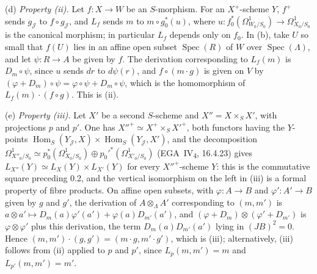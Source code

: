 (d) \emph{Property (ii).} Let \(f\colon X\to W\) be an \(S\)-morphism. For an
\(X^+\)-scheme \(Y\), \(f^+\) sends \(g_{\mathscr J}\) to
\(f\circ g_{\mathscr J}\), and \(L_f\) sends \(m\) to \(m\circ g_0^*(u)\),
where \(u\colon f_0^*(\Omega^1_{W_0/S_0})\to\Omega^1_{X_0/S_0}\) is the
canonical morphism; in particular \(L_f\) depends only on \(f_0\). In (b),
take \(U\) so small that \(f(U)\) lies in an affine open subset
\(\operatorname{Spec}(R)\) of \(W\) over \(\operatorname{Spec}(\Lambda)\), and
let \(\psi\colon R\to A\) be given by \(f\). The derivation corresponding to
\(L_f(m)\) is \(D_m\circ\psi\), since \(u\) sends \(dr\) to \(d\psi(r)\),
and \(f\circ(m\cdot g)\) is given on \(V\) by
\((\varphi+D_m)\circ\psi=\varphi\circ\psi+D_m\circ\psi\), which is the
homomorphism of \(L_f(m)\cdot(f\circ g)\). This is (ii).

(e) \emph{Property (iii).} Let \(X'\) be a second \(S\)-scheme and
\(X''=X\times_SX'\), with projections \(p\) and \(p'\). One has
\(X''^+\simeq X^+\times_SX'^+\), both functors having the \(Y\)-points
\(\operatorname{Hom}_S(Y_{\mathscr J},X)\times
\operatorname{Hom}_S(Y_{\mathscr J},X')\), and the decomposition
\(\Omega^1_{X''_0/S_0}\simeq p_0^*(\Omega^1_{X_0/S_0})\oplus
p_0'^*(\Omega^1_{X'_0/S_0})\) (EGA~IV\textsubscript{4}, 16.4.23) gives
\(L_{X''}(Y)\simeq L_X(Y)\times L_{X'}(Y)\) for every \(X''^+\)-scheme
\(Y\): this is the commutative square preceding 0.2, and the vertical
isomorphism on the left in (iii) is a formal property of fibre products. On
affine open subsets, with \(\varphi\colon A\to B\) and
\(\varphi'\colon A'\to B\) given by \(g\) and \(g'\), the derivation of
\(A\otimes_\Lambda A'\) corresponding to \((m,m')\) is
\(a\otimes a'\mapsto D_m(a)\varphi'(a')+\varphi(a)D_{m'}(a')\), and
\((\varphi+D_m)\otimes(\varphi'+D_{m'})\) is \(\varphi\otimes\varphi'\)
plus this derivation, the term \(D_m(a)D_{m'}(a')\) lying in
\((JB)^2=0\). Hence \((m,m')\cdot(g,g')=(m\cdot g,m'\cdot g')\), which is
(iii); alternatively, (iii) follows from (ii) applied to \(p\) and \(p'\),
since \(L_p(m,m')=m\) and \(L_{p'}(m,m')=m'\).
